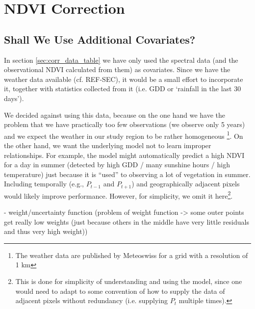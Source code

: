 \section{NDVI Correction}{
    \subsection{Shall We Use Additional Covariates?}{
        In section \ref{sec:corr_data_table} we have only used the spectral data (and the observational NDVI calculated from them) as covariates. Since we have the weather data available (cf. REF-SEC), it would be a small effort to incorporate it, together with statistics collected from it (i.e. GDD or `rainfall in the last 30 days'). 
    
        We decided against using this data, because on the one hand we have the problem that we have practically too few observations (we observe only 5 years) and we expect the weather in our study region to be rather homogeneous \footnote{The weather data are published by Meteoswiss for a grid with a resolution of 1 km}. On the other hand, we want the underlying model not to learn improper relationships. For example, the model might automatically predict a high NDVI for a day in summer (detected by high GDD / many sunshine hours / high temperature) just because it is ``used'' to observing a lot of vegetation in summer. 
        Including temporally (e.g., $P_{t-1}$ and $P_{t+1}$) and geographically adjacent pixels would likely improve performance. However, for simplicity, we omit it here\footnote{This is done for simplicity of understanding and using the model, since one would need to adapt to some convention of how to supply the data of adjacent pixels without redundancy (i.e. supplying $P_t$ multiple times).}.
    }

    - weight/uncertainty function 
    (problem of weight function -> some outer points get really low weights (just because others in the middle have very little residuals and thus very high weight))
}

